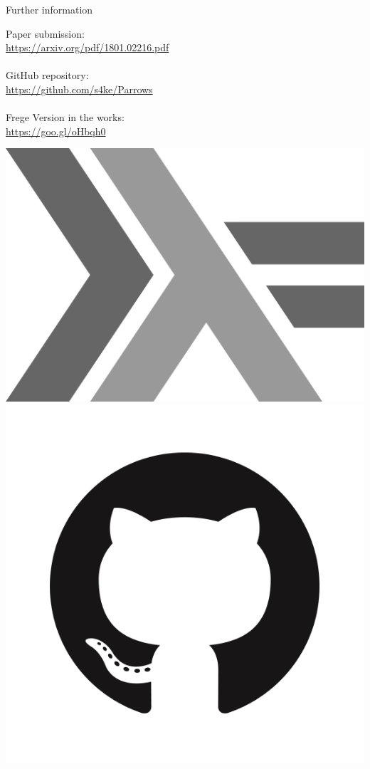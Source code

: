 \begin{frame}[fragile]{Further information}
	\begin{minipage}{0.6\textwidth}
	Paper submission:\\
	\url{https://arxiv.org/pdf/1801.02216.pdf}\\~\\
	GitHub repository:\\
	\url{https://github.com/s4ke/Parrows}\\~\\
	Frege Version in the works:\\
	\url{https://goo.gl/oHbqh0}
	\end{minipage}
	\hfill
	\begin{minipage}{0.3\textwidth}
		\begin{center}
			\vspace{0.5cm}
			\includegraphics[scale=0.025]{images/haskell-logo}\\
			\vspace{0.3cm}
			\includegraphics[scale=0.1]{images/GitHub-Mark}\\

\end{center}
\end{minipage}
\end{frame}
